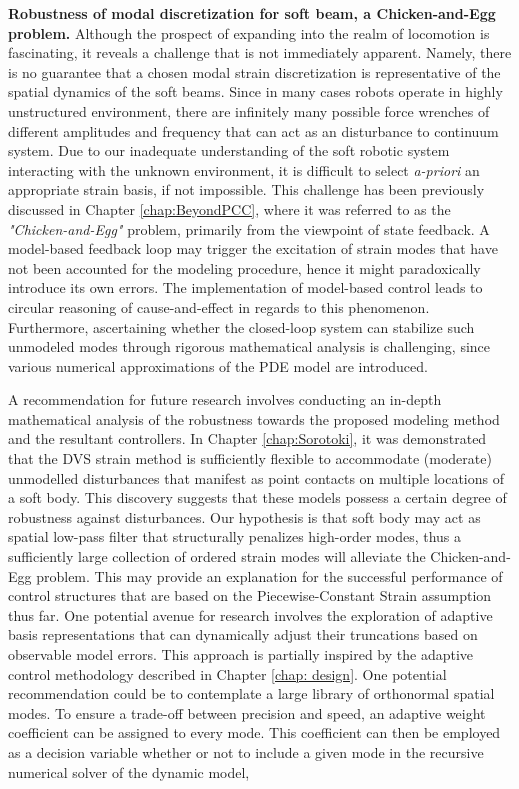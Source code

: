 \textbf{Robustness of modal discretization for soft beam, a Chicken-and-Egg problem.} Although the prospect of expanding into the realm of locomotion is fascinating, it reveals a challenge that is not immediately apparent. Namely, there is no guarantee that a chosen modal strain discretization is representative of the spatial dynamics of the soft beams. Since in many cases robots operate in highly unstructured environment, there are infinitely many possible force wrenches of different amplitudes and frequency that can act as an disturbance to continuum system. Due to our inadequate understanding of the soft robotic system interacting with the unknown environment, it is difficult to select \textit{a-priori} an appropriate strain basis, if not impossible. This challenge has been previously discussed in Chapter \ref{chap:BeyondPCC}, where it was referred to as the \textit{"Chicken-and-Egg"} problem, primarily from the viewpoint of state feedback. A model-based feedback loop may trigger the excitation of strain modes that have not been accounted for the modeling procedure, hence it might paradoxically introduce its own errors. The implementation of model-based control leads to circular reasoning of cause-and-effect in regards to this phenomenon. Furthermore, ascertaining whether the closed-loop system can stabilize such unmodeled modes through rigorous mathematical analysis is challenging, since various numerical approximations of the PDE model are introduced.

A recommendation for future research involves conducting an in-depth mathematical analysis of the robustness towards the proposed modeling method and the resultant controllers. In Chapter \ref{chap:Sorotoki}, it was demonstrated that the DVS strain method is sufficiently flexible to accommodate (moderate) unmodelled disturbances that manifest as point contacts on multiple locations of a soft body. This discovery suggests that these models possess a certain degree of robustness against disturbances. Our hypothesis is that soft body may act as spatial low-pass filter that structurally penalizes high-order modes, thus a sufficiently large collection of ordered strain modes will alleviate the {Chicken-and-Egg} problem. This may provide an explanation for the successful performance of control structures that are based on the Piecewise-Constant Strain assumption thus far. One potential avenue for research involves the exploration of adaptive basis representations that can dynamically adjust their truncations based on observable model errors. This approach is partially inspired by the adaptive control methodology described in Chapter \ref{chap: design}. One potential recommendation could be to contemplate a large library of orthonormal spatial modes. To ensure a trade-off between precision and speed, an adaptive weight coefficient can be assigned to every mode. This coefficient can then be employed as a decision variable whether or not to include a given mode in the recursive numerical solver of the dynamic model, 

